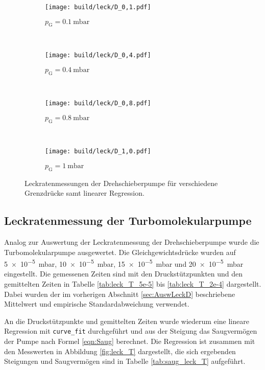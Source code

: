 \begin{figure}
  \centering
  \begin{subfigure}[b]{0.48\textwidth}
    \texttt{[image: build/leck/D\_0,1.pdf]}
    \caption{$p_\text{G} = \SI{0.1}{\milli\bar}$}
  \end{subfigure}
  ~ %
  \begin{subfigure}[b]{0.48\textwidth}
    \texttt{[image: build/leck/D\_0,4.pdf]}
    \caption{$p_\text{G} = \SI{0.4}{\milli\bar}$}
  \end{subfigure}
  \\
  \begin{subfigure}[b]{0.48\textwidth}
    \texttt{[image: build/leck/D\_0,8.pdf]}
    \caption{$p_\text{G} = \SI{0.8}{\milli\bar}$}
  \end{subfigure}
  ~ %
  \begin{subfigure}[b]{0.48\textwidth}
    \texttt{[image: build/leck/D\_1,0.pdf]}
    \caption{$p_\text{G} = \SI{1}{\milli\bar}$}
  \end{subfigure}
  \caption{Leckratenmessungen der Drehschieberpumpe für verschiedene Grenzdrücke samt linearer Regression.}
  \label{fig:leck_D}
\end{figure}


\FloatBarrier

\subsection{Leckratenmessung der Turbomolekularpumpe}
\label{sec:AuswLeckT}

Analog zur Auswertung der Leckratenmessung der Drehschieberpumpe wurde die
Turbomolekularpumpe ausgewertet.
Die Gleichgewichtsdrücke wurden auf
\SI{5e-5}{\milli\bar}, \SI{10e-5}{\milli\bar}, \SI{15e-5}{\milli\bar} und \SI{20e-5}{\milli\bar}
eingestellt. Die gemessenen Zeiten sind mit den Druckstützpunkten und den
gemittelten Zeiten in Tabelle \ref{tab:leck_T_5e-5} bis \ref{tab:leck_T_2e-4}
dargestellt. Dabei wurden der im vorherigen Abschnitt \ref{sec:AuswLeckD}
beschriebene Mittelwert und empirische Standardabweichung verwendet.





\FloatBarrier

An die Druckstützpunkte und gemittelten Zeiten wurde wiederum eine lineare
Regression mit \texttt{curve\_fit} durchgeführt und aus der Steigung das
Saugvermögen der Pumpe nach Formel \eqref{eqn:Saug} berechnet.
Die Regression ist zusammen mit den Messwerten in Abbildung
\ref{fig:leck_T} dargestellt, die sich ergebenden Steigungen und
Saugvermögen sind in Tabelle \ref{tab:saug_leck_T} aufgeführt.


